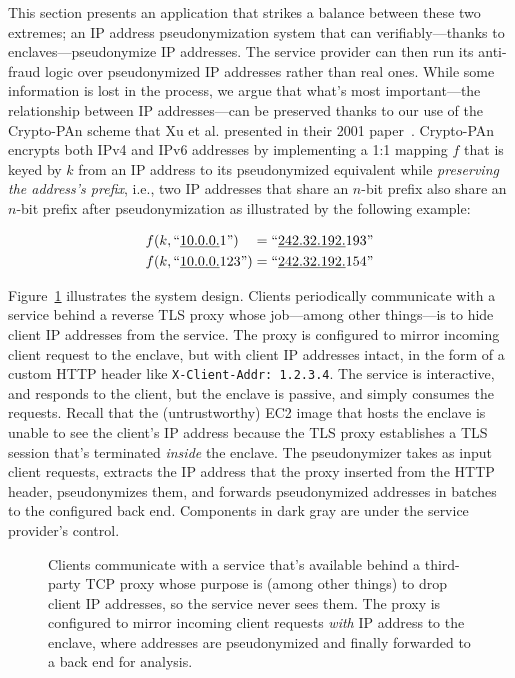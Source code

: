 This section presents an application that strikes a balance between these two
extremes; an IP address pseudonymization system that can verifiably---thanks to
enclaves---pseudonymize IP addresses.  The service provider can then run its
anti-fraud logic over pseudonymized IP addresses rather than real ones.  While
some information is lost in the process, we argue that what's most
important---the relationship between IP addresses---can be preserved thanks to
our use of the Crypto-PAn scheme that Xu et al. presented in their 2001
paper~\cite{Xu01a}.  Crypto-PAn encrypts both IPv4 and IPv6 addresses by
implementing a 1:1 mapping $f$ that is keyed by $k$ from an IP address to its
pseudonymized equivalent while \emph{preserving the address's prefix}, i.e., two
IP addresses that share an $n$-bit prefix also share an $n$-bit prefix after
pseudonymization as illustrated by the following example:

\begin{align}
f(k, \textrm{``\underline{10.0.0.}1''})\phantom{23} = \textrm{``\underline{242.32.192.}193''} \\
f(k, \textrm{``\underline{10.0.0.}123''}) = \textrm{``\underline{242.32.192.}154''}
\end{align}

Figure~\ref{fig:address-anonymizer} illustrates the system design.  Clients
periodically communicate with a service behind a reverse TLS proxy whose
job---among other things---is to hide client IP addresses from the service.  The
proxy is configured to mirror incoming client request to the enclave, but with
client IP addresses intact, in the form of a custom HTTP header like
\texttt{X-Client-Addr: 1.2.3.4}.  The service is interactive, and responds to
the client, but the enclave is passive, and simply consumes the requests.
Recall that the (untrustworthy) EC2 image that hosts the enclave is unable to
see the client's IP address because the TLS proxy establishes a TLS session
that's terminated \emph{inside} the enclave.  The pseudonymizer takes as input
client requests, extracts the IP address that the proxy inserted from the HTTP
header, pseudonymizes them, and forwards pseudonymized addresses in batches to
the configured back end.  Components in dark gray are under the service
provider's control.

\begin{figure}[t]
\centering

\caption{Clients communicate with a service that's available behind a
  third-party TCP proxy whose purpose is (among other things) to drop client IP
  addresses, so the service never sees them.  The proxy is configured to mirror
  incoming client requests \emph{with} IP address to the enclave, where
  addresses are pseudonymized and finally forwarded to a back end for analysis.}
\label{fig:address-anonymizer}
\end{figure}

